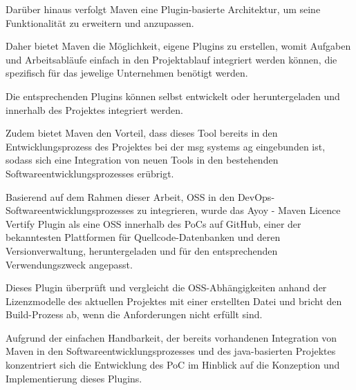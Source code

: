 Darüber hinaus verfolgt Maven eine Plugin-basierte Architektur, um seine Funktionalität zu erweitern und anzupassen. \cite[S. 28]{spiller_maven_2011} 

Daher bietet Maven die Möglichkeit, eigene Plugins zu erstellen, womit Aufgaben und Arbeitsabläufe einfach in den Projektablauf integriert werden können, die spezifisch für das jewelige Unternehmen benötigt werden. \cite[S. 3]{varanasi_introducing_2019}

Die entsprechenden Plugins können selbst entwickelt oder heruntergeladen und innerhalb des Projektes integriert werden.  

Zudem bietet Maven den Vorteil, dass dieses Tool bereits in den Entwicklungsprozess des Projektes bei der msg systems ag eingebunden ist, sodass sich eine Integration von neuen Tools in den bestehenden Softwareentwicklungsprozesses erübrigt.

Basierend auf dem Rahmen dieser Arbeit, OSS in den DevOps-Softwareentwicklungsprozesses zu integrieren, wurde das Ayoy - Maven Licence Vertify Plugin \cite{allberg_ayoyabayoy-maven-license-verifier-plugin_2021} als eine OSS innerhalb des PoCs auf GitHub, einer der bekanntesten Plattformen für Quellcode-Datenbanken und deren Versionverwaltung, heruntergeladen und für den entsprechenden Verwendungszweck angepasst.

Dieses Plugin überprüft und vergleicht die OSS-Abhängigkeiten anhand der Lizenzmodelle des aktuellen Projektes mit einer erstellten Datei und bricht den Build-Prozess ab, wenn die Anforderungen nicht erfüllt sind.

Aufgrund der einfachen Handbarkeit, der bereits vorhandenen Integration von Maven in den Softwareentwicklungsprozesses und des java-basierten Projektes konzentriert sich die Entwicklung des PoC im Hinblick auf die Konzeption und Implementierung dieses Plugins. 



